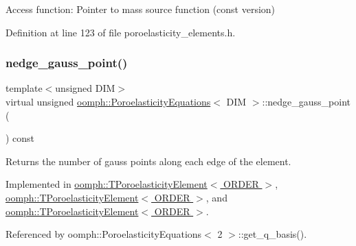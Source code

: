 Access function\+: Pointer to mass source function (const version) 



Definition at line 123 of file poroelasticity\+\_\+elements.\+h.

\mbox{\label{classoomph_1_1PoroelasticityEquations_aa01b0fb38667776634b5f33bf8859886}} 
\subsubsection{\texorpdfstring{nedge\+\_\+gauss\+\_\+point()}{nedge\_gauss\_point()}}
{\footnotesize\ttfamily template$<$unsigned D\+IM$>$ \\
virtual unsigned \hyperlink{classoomph_1_1PoroelasticityEquations}{oomph\+::\+Poroelasticity\+Equations}$<$ D\+IM $>$\+::nedge\+\_\+gauss\+\_\+point (\begin{DoxyParamCaption}{ }\end{DoxyParamCaption}) const\hspace{0.3cm}{\ttfamily [pure virtual]}}



Returns the number of gauss points along each edge of the element. 



Implemented in \hyperlink{classoomph_1_1TPoroelasticityElement_a43bec0e682f98fd6961cd02bd469dac2}{oomph\+::\+T\+Poroelasticity\+Element$<$ O\+R\+D\+E\+R $>$}, \hyperlink{classoomph_1_1TPoroelasticityElement_a8dabd82d779752499883ac3fdd36d5d3}{oomph\+::\+T\+Poroelasticity\+Element$<$ O\+R\+D\+E\+R $>$}, and \hyperlink{classoomph_1_1TPoroelasticityElement_a7e718424977eb2ce26c0b5f3703ce89f}{oomph\+::\+T\+Poroelasticity\+Element$<$ O\+R\+D\+E\+R $>$}.



Referenced by oomph\+::\+Poroelasticity\+Equations$<$ 2 $>$\+::get\+\_\+q\+\_\+basis().

\mbox{\label{classoomph_1_1PoroelasticityEquations_a44a16186f2923f811623e0cf088ff815}} 
